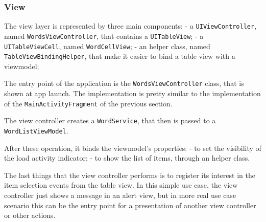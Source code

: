 \subsubsection{View}\label{view}

The view layer is represented by three main components: - a
\texttt{UIViewController}, named \texttt{WordsViewController}, that
contains a \texttt{UITableView}; - a \texttt{UITableViewCell}, named
\texttt{WordCellView}; - an helper class, named
\texttt{TableViewBindingHelper}, that make it easier to bind a table
view with a viewmodel;

The entry point of the application is the \texttt{WordsViewController}
class, that is shown at app launch. The implementation is pretty similar
to the implementation of the \texttt{MainActivityFragment} of the
previous section.

The view controller creates a \texttt{WordService}, that then is passed
to a \texttt{WordListViewModel}.

After these operation, it binds the viewmodel's properties: - to set the
visibility of the load activity indicator; - to show the list of items,
through an helper class.

The last things that the view controller performs is to register its
interest in the item selection events from the table view. In this
simple use case, the view controller just shows a message in an alert
view, but in more real use case scenario this can be the entry point for
a presentation of another view controller or other actions.

